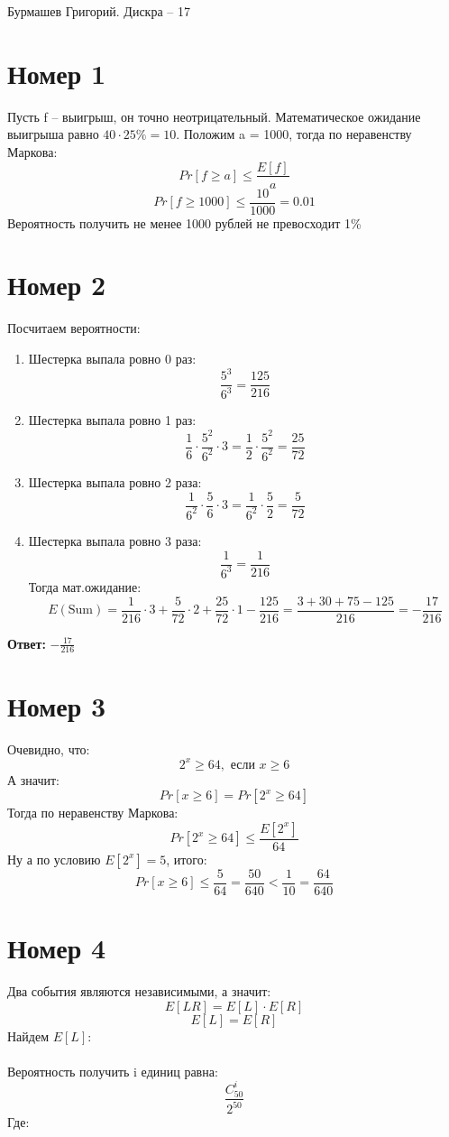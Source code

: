 \documentclass[a4paper,12pt]{article}
\author{Бурмашев Григорий, БПМИ-208}
\title{}
\date{\today}
\begin{document}
\begin{center}
Бурмашев Григорий. Дискра -- 17
\end{center}
\section*{Номер 1}
Пусть f -- выигрыш, он точно неотрицательный. Математическое ожидание выигрыша равно $40 \cdot 25\% = 10$. Положим a = 1000, тогда по неравенству Маркова:
\[
Pr[f \geq a] \leq \frac{E[f]}{a}
\]
\[
Pr[f \geq 1000] \leq \frac{10}{1000}  = 0.01
\]
Вероятность получить не менее 1000 рублей не превосходит 1\%
\section*{Номер 2}
Посчитаем вероятности:
\begin{enumerate}
\item Шестерка выпала ровно 0 раз:
\[
\frac{5^3}{6^3} = \frac{125}{216}
\]
\item Шестерка выпала ровно 1 раз:
\[
\frac{1}{6} \cdot \frac{5^2}{6^2} \cdot 3 = \frac{1}{2} \cdot \frac{5^2}{6^2} = \frac{25}{72}
\]
\item Шестерка выпала ровно 2 раза:
\[
\frac{1}{6^2} \cdot \frac{5}{6} \cdot 3 = \frac{1}{6^2} \cdot \frac{5}{2}  = \frac{5}{72}
\]
\item Шестерка выпала ровно 3 раза:
\[
\frac{1}{6^3} = \frac{1}{216}
\]
Тогда мат.ожидание:
\[
E(\text{Sum}) = \frac{1}{216} \cdot 3 + \frac{5}{72} \cdot 2 + \frac{25}{72} \cdot 1 - \frac{125}{216} = \frac{3 + 30 + 75 - 125 }{216} = -\frac{17}{216}
\]
\end{enumerate}
\begin{center}
\textbf{Ответ: } $-\frac{17}{216}$
\end{center}
\clearpage
\section*{Номер 3}
Очевидно, что:
\[
2^x \geq 64, \text{ если }  x \geq 6
\]
А значит:
\[
Pr[x \geq 6] = Pr[2^x \geq 64]
\]
Тогда по неравенству Маркова:
\[
Pr[2^x \geq 64] \leq \frac{E[2^x]}{64}
\]
Ну а по условию $E[2^x] = 5$, итого:
\[
Pr[x \geq 6] \leq \frac{5}{64} = \frac{50}{640} < \frac{1}{10} = \frac{64}{640}
\]
\section*{Номер 4}
Два события являются независимыми, а значит:
\[
E[LR] = E[L] \cdot E[R]
\]
\[
E[L] = E[R]
\]
Найдем $E[L]$:
\\\\
Вероятность получить i единиц равна:
\[
\frac{C^i_{50}}{2^{50}}
\]
Где:
\end{document}
